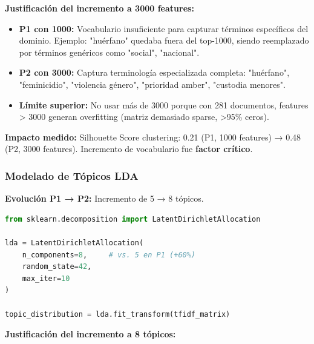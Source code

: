 \textbf{Justificación del incremento a 3000 features:}

\begin{itemize}
    \item \textbf{P1 con 1000:} Vocabulario insuficiente para capturar términos específicos del dominio. Ejemplo: "huérfano" quedaba fuera del top-1000, siendo reemplazado por términos genéricos como "social", "nacional".
    
    \item \textbf{P2 con 3000:} Captura terminología especializada completa: "huérfano", "feminicidio", "violencia género", "prioridad amber", "custodia menores".
    
    \item \textbf{Límite superior:} No usar más de 3000 porque con 281 documentos, features > 3000 generan overfitting (matriz demasiado sparse, >95\% ceros).
\end{itemize}

\textbf{Impacto medido:} Silhouette Score clustering: 0.21 (P1, 1000 features) → 0.48 (P2, 3000 features). Incremento de vocabulario fue \textbf{factor crítico}.

\subsubsection{Modelado de Tópicos LDA}

\textbf{Evolución P1 → P2:} Incremento de 5 → 8 tópicos.

\begin{lstlisting}[language=Python, caption={Configuración LDA del P2}]
from sklearn.decomposition import LatentDirichletAllocation

lda = LatentDirichletAllocation(
    n_components=8,     # vs. 5 en P1 (+60%)
    random_state=42,
    max_iter=10
)

topic_distribution = lda.fit_transform(tfidf_matrix)
\end{lstlisting}

\textbf{Justificación del incremento a 8 tópicos:}

